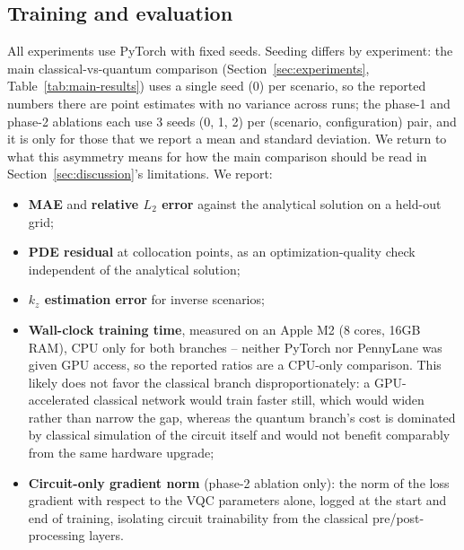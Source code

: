 \subsection{Training and evaluation}
All experiments use PyTorch with fixed seeds. Seeding differs by
experiment: the main classical-vs-quantum comparison
(Section~\ref{sec:experiments}, Table~\ref{tab:main-results}) uses a
single seed (0) per scenario, so the reported numbers there are point
estimates with no variance across runs; the phase-1 and phase-2 ablations
each use 3 seeds (0, 1, 2) per (scenario, configuration) pair, and it is
only for those that we report a mean and standard deviation. We return to
what this asymmetry means for how the main comparison should be read in
Section~\ref{sec:discussion}'s limitations. We report:
\begin{itemize}
  \item \textbf{MAE} and \textbf{relative $L_2$ error} against the
    analytical solution on a held-out grid;
  \item \textbf{PDE residual} at collocation points, as an
    optimization-quality check independent of the analytical solution;
  \item \textbf{$k_z$ estimation error} for inverse scenarios;
  \item \textbf{Wall-clock training time}, measured on an Apple M2 (8
    cores, 16GB RAM), CPU only for both branches -- neither PyTorch nor
    PennyLane was given GPU access, so the reported ratios are a CPU-only
    comparison. This likely does not favor the classical branch
    disproportionately: a GPU-accelerated classical network would train
    faster still, which would widen rather than narrow the gap, whereas
    the quantum branch's cost is dominated by classical simulation of the
    circuit itself and would not benefit comparably from the same
    hardware upgrade;
  \item \textbf{Circuit-only gradient norm} (phase-2 ablation only): the
    norm of the loss gradient with respect to the VQC parameters alone,
    logged at the start and end of training, isolating circuit
    trainability from the classical pre/post-processing layers.
\end{itemize}
